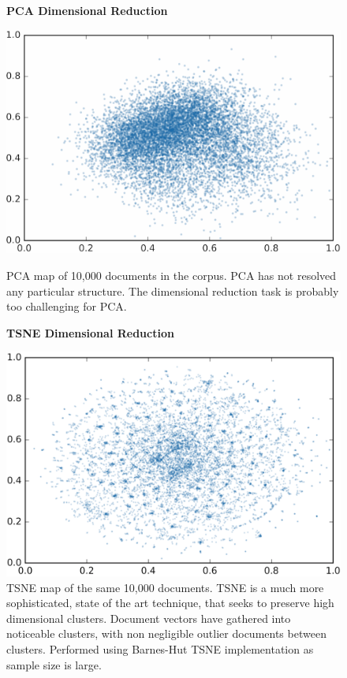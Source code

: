 \begin{figure}[H]
  \centering
  \begin{minipage}[b]{0.49\textwidth}
	\begin{center}\textbf{PCA Dimensional Reduction}\end{center}
    \includegraphics[width=\textwidth]{Validation/pca2.png}
    \caption[PCA Dimensional Reduction]{PCA map of 10,000 documents in the corpus. PCA has not resolved any particular structure. The dimensional reduction task is probably too challenging for PCA.}
      \label{fig:PCA_snap}
  \end{minipage}
  \hfill
  \begin{minipage}[b]{0.49\textwidth}
  \begin{center}\textbf{TSNE Dimensional Reduction}\end{center}
    \includegraphics[width=\textwidth]{Validation/tsne2.png}
    \caption[TSNE Dimensional Reduction]{TSNE map of the same 10,000 documents. TSNE is a much more sophisticated, state of the art technique, that seeks to preserve high dimensional clusters. Document vectors have gathered into noticeable clusters, with non negligible outlier documents between clusters. Performed using Barnes-Hut TSNE implementation as sample size is large. }
      \label{fig:TSNE_snap}

  \end{minipage}
\end{figure}
